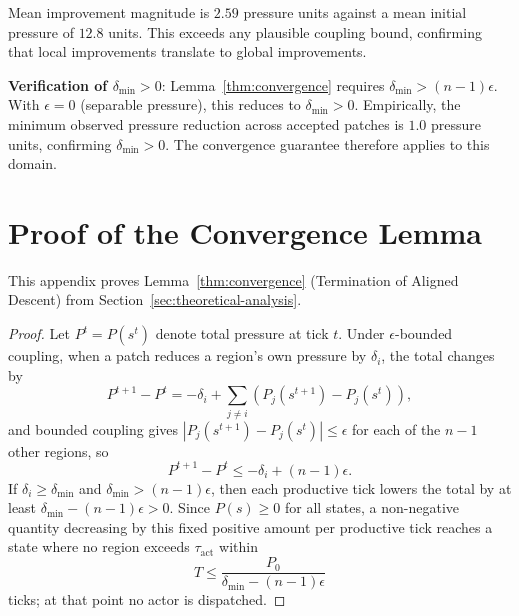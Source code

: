Mean improvement magnitude is $2.59$ pressure units against a mean initial pressure of $12.8$ units. This exceeds any plausible coupling bound, confirming that local improvements translate to global improvements.

\textbf{Verification of $\delta_{\min} > 0$}: Lemma~\ref{thm:convergence} requires $\delta_{\min} > (n-1)\epsilon$. With $\epsilon = 0$ (separable pressure), this reduces to $\delta_{\min} > 0$. Empirically, the minimum observed pressure reduction across accepted patches is $1.0$ pressure units, confirming $\delta_{\min} > 0$. The convergence guarantee therefore applies to this domain.


\section{Proof of the Convergence Lemma}
\label{app:proofs}

This appendix proves Lemma~\ref{thm:convergence} (Termination of Aligned Descent) from Section~\ref{sec:theoretical-analysis}.

\begin{proof}
Let $P^t = P(s^t)$ denote total pressure at tick $t$. Under $\epsilon$-bounded coupling, when a patch reduces a region's own pressure by $\delta_i$, the total changes by
\[
P^{t+1} - P^t = -\delta_i + \sum_{j \neq i} (P_j(s^{t+1}) - P_j(s^t)),
\]
and bounded coupling gives $|P_j(s^{t+1}) - P_j(s^t)| \leq \epsilon$ for each of the $n-1$ other regions, so
\[
P^{t+1} - P^t \leq -\delta_i + (n-1)\epsilon.
\]
If $\delta_i \geq \delta_{\min}$ and $\delta_{\min} > (n-1)\epsilon$, then each productive tick lowers the total by at least $\delta_{\min} - (n-1)\epsilon > 0$. Since $P(s) \geq 0$ for all states, a non-negative quantity decreasing by this fixed positive amount per productive tick reaches a state where no region exceeds $\tau_{\text{act}}$ within
\[
T \leq \frac{P_0}{\delta_{\min} - (n-1)\epsilon}
\]
ticks; at that point no actor is dispatched.
\end{proof}
